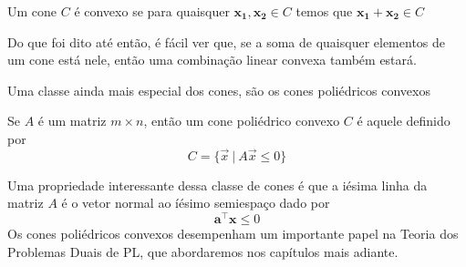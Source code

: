\begin{def:cone convexo}
	Um cone $C$ é convexo se para quaisquer $\mathbf{x_1, x_2} \in C$ temos que $\mathbf{x_1} + \mathbf{x_2} \in C$
\end{def:cone convexo}

Do que foi dito até então, é fácil ver que, se a soma de quaisquer elementos de um cone está nele, então uma combinação linear convexa também estará.

Uma classe ainda mais especial dos cones, são os cones poliédricos convexos

\begin{def:cpc}
	Se $A$ é um matriz $m \times n$, então um cone poliédrico convexo $C$ é aquele definido por
	\begin{equation*}
		C = \{\vec{x}\ |\ A \vec{x} \leq 0\}
	\end{equation*}  
\end{def:cpc}

Uma propriedade interessante dessa classe de cones é que a iésima linha da matriz $A$ é o vetor normal ao íésimo semiespaço dado por \[\mathbf{a^\intercal x} \leq 0\]Os cones poliédricos convexos desempenham um importante papel na Teoria dos Problemas Duais de PL, que abordaremos nos capítulos mais adiante.

